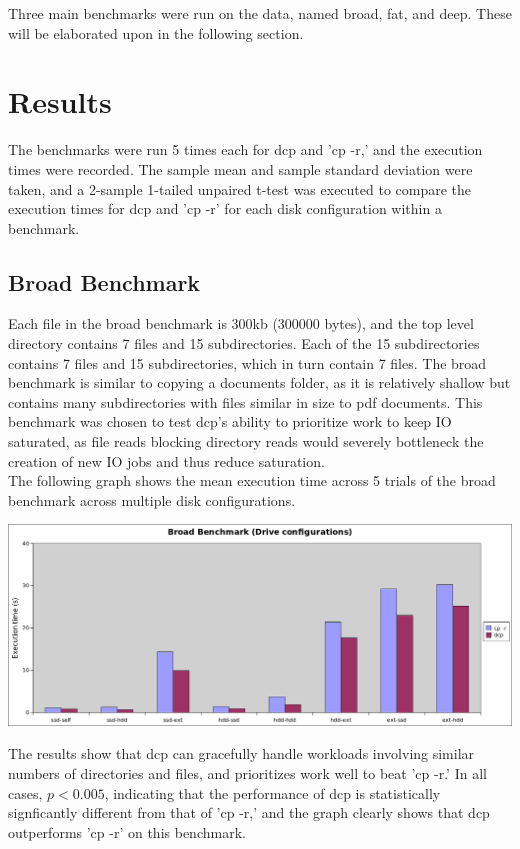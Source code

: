 \documentclass[12pt]{article}
\begin{document}
Three main benchmarks were run on the data, named broad, fat, and deep.
These will be elaborated upon in the following section.\\

\section{Results}
The benchmarks were run 5 times each for dcp and 'cp -r,' and the execution
times were recorded. The sample mean and sample standard deviation were taken,
and a 2-sample 1-tailed unpaired t-test was executed to compare the execution
times for dcp and 'cp -r' for each disk configuration within a benchmark.\\

\subsection{Broad Benchmark}
Each file in the broad benchmark is 300kb (300000 bytes), and
the top level directory contains 7 files and 15 subdirectories. Each of the 15 subdirectories
contains 7 files and 15 subdirectories, which in turn contain 7 files.
The broad benchmark is similar to copying a  documents folder, as it is
relatively shallow but contains many subdirectories with files similar in size to
pdf documents. This benchmark was chosen to test dcp's ability to prioritize work
to keep IO saturated, as file reads blocking directory reads would severely bottleneck
the creation of new IO jobs and thus reduce saturation.\\
\noindent
The following graph shows the mean execution time across 5 trials of the broad benchmark across multiple disk configurations.
\vspace{5mm}

\includegraphics[width=500pt]{report/graphs/broad-manydisk.png}

\vspace{5mm}

The results show that dcp can gracefully handle workloads involving
similar numbers of directories and files, and prioritizes work
well to beat 'cp -r.' In all cases, $p < 0.005$, indicating that
the performance of dcp is statistically signficantly different from
that of 'cp -r,' and the graph clearly shows that dcp outperforms
'cp -r' on this benchmark. \\
\end{document}
